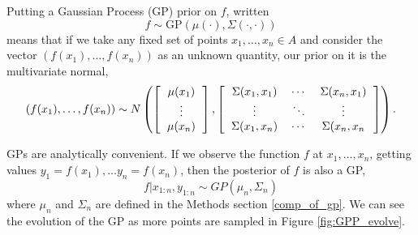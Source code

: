\documentclass[phd,tocprelim]{cornell}
\begin{document}
Putting a Gaussian Process (GP) prior on $f$, written
\begin{equation}
 f \sim \mbox{GP}(\mu(\cdot), \Sigma(\cdot, \cdot))
\end{equation}
means that if we take any fixed set of points $x_{1}, \ldots, x_{n} \in A$ and consider the vector $(f(x_{1}), \ldots, f(x_{n}))$ as an unknown quantity, our prior on it is the multivariate normal,
\begin{equation}
(f(x_{1}), \ldots, f(x_{n})) \sim N\left( \left[ \begin{tabular}{c} $\mu(x_{1})$ \\ $\vdots$ \\ $\mu(x_{n})$ \end{tabular} \right] , \left[ \begin{tabular}{ccc} $\Sigma(x_{1}, x_{1})$ & $\cdots$ & $\Sigma(x_{n}, x_{1})$ \\ $\vdots$ & $\ddots$ & $\vdots$ \\ $\Sigma(x_{1}, x_{n})$ & $\cdots$ & $\Sigma(x_{n},x_{n}$ \end{tabular} \right] \right).
\end{equation}

GPs are analytically convenient. If we observe the function $f$ at $x_{1}, \ldots, x_{n}$, getting values $y_{1} = f(x_{1}), \ldots y_{n} = f(x_{n})$, then the posterior of $f$ is also a GP,
\begin{equation}
 f|x_{1:n}, y_{1:n} \sim GP(\mu_{n}, \Sigma_{n})
\end{equation}
where $\mu_{n}$ and $\Sigma_{n}$ are defined in the Methods section \ref{comp_of_gp}. We can see the evolution of the GP as more points are sampled in Figure \ref{fig:GPP_evolve}.
\end{document}
